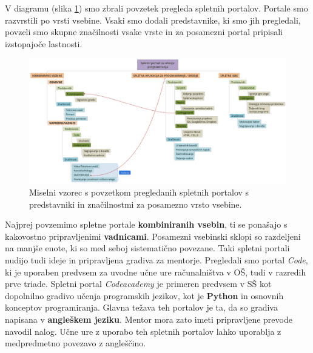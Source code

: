 V diagramu (slika \ref{fig:spup_povzetek}) smo zbrali povzetek
pregleda spletnih portalov. Portale smo razvrstili po vrsti
vsebine. Vsaki smo dodali predstavnike, ki smo jih pregledali, povzeli
smo skupne značilnosti vsake vrste in za posamezni portal pripisali
izstopajoče lastnosti.
\begin{figure}[h!]
  \centering
    \includegraphics [width=1\linewidth, keepaspectratio =
   1] {./images/SPUP_povzetek-xmind.png}
   \caption{Miselni vzorec s povzetkom pregledanih spletnih portalov s
   predstavniki in značilnostmi za posamezno vrsto vsebine.}
 \label{fig:spup_povzetek}
\end{figure}

Najprej povzemimo spletne portale \textbf{kombiniranih vsebin}, ti se
ponašajo s kakovostno pripravljenimi \textbf{vadnicami}. Posamezni
vsebinski sklopi so razdeljeni na manjše enote, ki so med seboj
sistematično povezane. Taki spletni portali nudijo tudi ideje in
pripravljena gradiva za mentorje. Pregledali smo portal \emph{Code},
ki je uporaben predvsem za uvodne učne ure računalništva v OŠ, tudi v
razredih prve triade. Spletni portal \emph{Codeacademy} je primeren
predvsem v SŠ kot dopolnilno gradivo učenja programskih jezikov, kot je
\textbf{Python} in osnovnih konceptov programiranja. Glavna težava teh
portalov je ta, da so gradiva napisana v \textbf{angleškem
  jeziku}. Mentor mora zato imeti pripravljene prevode navodil
nalog. Učne ure z uporabo teh spletnih portalov lahko uporablja z medpredmetno povezavo z angleščino.

